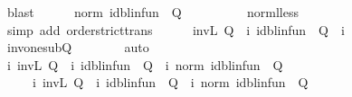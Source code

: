 \begin{isabellebody}
\ blast\isanewline
\ \ \ \ \isamarkupfalse%
\ {\isachardoublequoteopen}norm\ {\isacharparenleft}{\kern0pt}id{\isacharunderscore}{\kern0pt}blinfun\ {\isacharminus}{\kern0pt}\ Q{\isacharparenright}{\kern0pt}\ {\isacharless}{\kern0pt}\ {}{\isachardoublequoteclose}\isanewline
\ \ \ \ \ \ \isamarkupfalse%
\ norm{\isacharunderscore}{\kern0pt}{\isasymP}l{\isacharunderscore}{\kern0pt}less\isanewline
\ \ \ \ \ \ \isamarkupfalse%
\ {\isacharparenleft}{\kern0pt}simp\ add{\isacharcolon}{\kern0pt}\ order{\isachardot}{\kern0pt}strict{\isacharunderscore}{\kern0pt}trans{}{\isacharparenright}{\kern0pt}\isanewline
\ \ \ \ \isamarkupfalse%
\ {\isachardoublequoteopen}inv\isactrlsub L\ Q\ {\isacharequal}{\kern0pt}\ {\isacharparenleft}{\kern0pt}{\isasymSum}i{\isachardot}{\kern0pt}\ {\isacharparenleft}{\kern0pt}id{\isacharunderscore}{\kern0pt}blinfun\ {\isacharminus}{\kern0pt}\ Q{\isacharparenright}{\kern0pt}\ {\isacharcircum}{\kern0pt}{\isacharcircum}{\kern0pt}\ i{\isacharparenright}{\kern0pt}{\isachardoublequoteclose}\isanewline
\ \ \ \ \ \ \isamarkupfalse%
\ inv{\isacharunderscore}{\kern0pt}one{\isacharunderscore}{\kern0pt}sub{\isacharunderscore}{\kern0pt}Q{\isacharprime}{\kern0pt}\isanewline
\ \ \ \ \ \ \isamarkupfalse%
\ auto\isanewline
\ \ \isamarkupfalse%
\isanewline
\isanewline
\ \ \isamarkupfalse%
\ i{}{\isacharcolon}{\kern0pt}\ {\isachardoublequoteopen}inv\isactrlsub L\ Q{}\ {\isacharequal}{\kern0pt}\ {\isacharparenleft}{\kern0pt}{\isasymSum}i{\isachardot}{\kern0pt}\ {\isacharparenleft}{\kern0pt}id{\isacharunderscore}{\kern0pt}blinfun\ {\isacharminus}{\kern0pt}\ Q{}{\isacharparenright}{\kern0pt}\ {\isacharcircum}{\kern0pt}{\isacharcircum}{\kern0pt}\ i{\isacharparenright}{\kern0pt}{\isachardoublequoteclose}\ {\isachardoublequoteopen}norm\ {\isacharparenleft}{\kern0pt}id{\isacharunderscore}{\kern0pt}blinfun\ {\isacharminus}{\kern0pt}\ Q{}{\isacharparenright}{\kern0pt}\ {\isacharless}{\kern0pt}\ {}{\isachardoublequoteclose}\ \isanewline
\ \ \ \ \ i{}{\isacharcolon}{\kern0pt}\ {\isachardoublequoteopen}inv\isactrlsub L\ Q{}\ {\isacharequal}{\kern0pt}\ {\isacharparenleft}{\kern0pt}{\isasymSum}i{\isachardot}{\kern0pt}\ {\isacharparenleft}{\kern0pt}id{\isacharunderscore}{\kern0pt}blinfun\ {\isacharminus}{\kern0pt}\ Q{}{\isacharparenright}{\kern0pt}\ {\isacharcircum}{\kern0pt}{\isacharcircum}{\kern0pt}\ i{\isacharparenright}{\kern0pt}{\isachardoublequoteclose}\ {\isachardoublequoteopen}norm\ {\isacharparenleft}{\kern0pt}id{\isacharunderscore}{\kern0pt}blinfun\ {\isacharminus}{\kern0pt}\ Q{}{\isacharparenright}{\kern0pt}\ {\isacharless}{\kern0pt}\ {}{\isachardoublequoteclose}\isanewline

\end{isabellebody}

